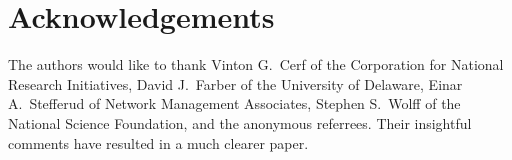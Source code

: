 
\section*	{Acknowledgements}
The authors would like to thank 
Vinton G.~Cerf of the Corporation for National Research Initiatives,
David J.~Farber of the University of Delaware,
Einar A.~Stefferud of Network Management Associates,
Stephen S.~Wolff of the National Science Foundation,
and the anonymous referrees.
Their insightful comments have resulted in a much clearer paper.
